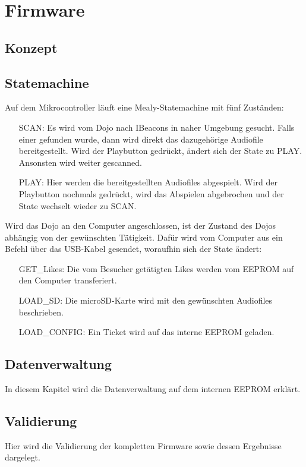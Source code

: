 \chapter{Firmware}
\label{Firmware}
\thispagestyle{fancy} 
\section{Konzept}
\section{Statemachine}
Auf dem Mikrocontroller läuft eine Mealy-Statemachine mit fünf Zuständen:\\
\begin{itemize}[leftmargin=3.2cm]
\item[SCAN:] Es wird vom Dojo nach IBeacons in naher Umgebung gesucht. Falls einer gefunden wurde, dann wird direkt das dazugehörige Audiofile bereitgestellt. Wird der Playbutton gedrückt, ändert sich der State zu PLAY. Ansonsten wird weiter gescanned.
\item[PLAY:] Hier werden die bereitgestellten Audiofiles abgespielt. Wird der Playbutton nochmals gedrückt, wird das Abspielen abgebrochen und der State wechselt wieder zu SCAN.
\end{itemize}
Wird das Dojo an den Computer angeschlossen, ist der Zustand des Dojos abhängig von der gewünschten Tätigkeit. Dafür wird vom Computer aus ein Befehl über das USB-Kabel gesendet, woraufhin sich der State ändert:
\begin{itemize}[leftmargin=3.2cm]
\item[GET\_Likes:] Die vom Besucher getätigten Likes werden vom EEPROM auf den Computer transferiert.
\item[LOAD\_SD:] Die microSD-Karte wird mit den gewünschten Audiofiles beschrieben.
\item[LOAD\_CONFIG:] Ein Ticket wird auf das interne EEPROM geladen.
\end{itemize}
 \section{Datenverwaltung}
In diesem Kapitel wird die Datenverwaltung auf dem internen EEPROM erklärt.
\section{Validierung}
Hier wird die Validierung der kompletten Firmware sowie dessen Ergebnisse dargelegt. 

